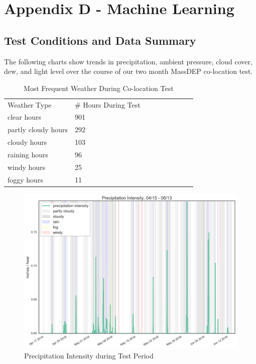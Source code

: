 \chapter{Appendix D - Machine Learning}

\section{Test Conditions and Data Summary}
\FloatBarrier

The following charts show trends in precipitation, ambient pressure, cloud cover, dew, and light level over the course of our two month MassDEP co-location test.

\begin{table}[H]
\centering
\begin{tabular}{lllllllll}
\\
\\
\toprule
Weather Type & \# Hours During Test \\
\midrule
clear hours & 901 \\
partly cloudy hours & 292 \\
cloudy hours & 103 \\
raining hours & 96 \\
windy hours & 25 \\
foggy hours & 11 \\
\bottomrule
\end{tabular}
\label{tab:as1_co_randomforest_features}
\caption{Most Frequent Weather During Co-location Test}
\end{table}


\begin{figure}[htb]
 	\includegraphics[width=\textwidth]{figs/precip_intensity}               
 	 \caption{Precipitation Intensity during Test Period}
  	\label{fig:precip_intensity}
\end{figure}

